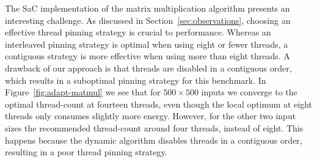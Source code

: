 The SaC implementation of the matrix multiplication algorithm presents an interesting challenge.
As discussed in Section~\ref{sec:observations}, choosing an effective thread pinning strategy is
crucial to performance. Whereas an interleaved pinning strategy is optimal when using eight or fewer
threads, a contiguous strategy is more effective when using more than eight threads. A drawback of
our approach is that threads are disabled in a contiguous order, which results in a suboptimal
pinning strategy for this benchmark. In Figure~\ref{fig:adapt-matmul} we see that for $500 \times
500$ inputs we converge to the optimal thread-count at fourteen threads, even though the local
optimum at eight threads only consumes slightly more energy. However, for the other two input sizes
the recommended thread-count around four threads, instead of eight. This happens because the dynamic
algorithm disables threads in a contiguous order, resulting in a poor thread pinning strategy.

